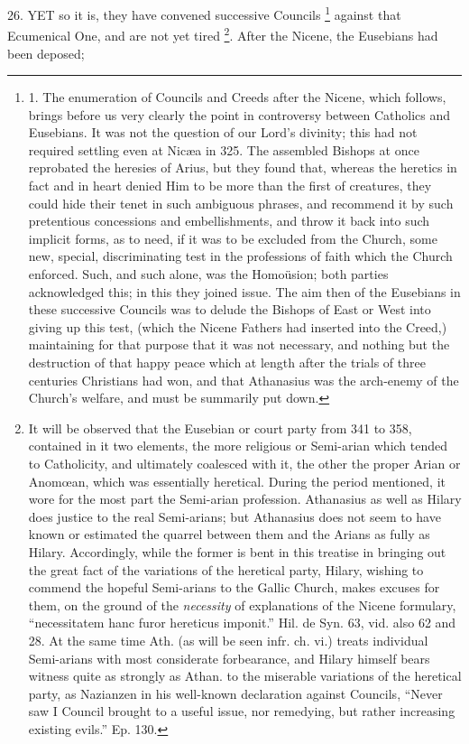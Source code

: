 26. YET
so it is, they have convened successive Councils \footnote{

1. The enumeration of Councils
and Creeds after the Nicene, which follows, brings before us very
clearly the point in controversy between Catholics and Eusebians. It
was not the question of our Lord's divinity; this had not required
settling even at Nicæa in 325. The assembled Bishops at once
reprobated the heresies of Arius, but they found that, whereas the
heretics in fact and in heart denied Him to be more than the first of
creatures, they could hide their tenet in such ambiguous phrases, and
recommend it by such pretentious concessions and embellishments, and
throw it back into such implicit forms, as to need, if it was to be
excluded from the Church, some new, special, discriminating test in
the professions of faith which the Church enforced. Such, and such
alone, was the Homoüsion; both parties acknowledged this; in this
they joined issue. The aim then of the Eusebians in these successive
Councils was to delude the Bishops of East or West into giving up this
test, (which the Nicene Fathers had inserted into the Creed,)
maintaining for that purpose that it was not necessary, and nothing
but the destruction of that happy peace which at length after the
trials of three centuries Christians had won, and that Athanasius was
the arch-enemy of the Church's welfare, and must be summarily put
down.} against that Ecumenical One, and are not yet tired \footnote{It will be observed that the Eusebian or court party from 341 to 358,
contained in it two elements, the more religious or Semi-arian which
tended to Catholicity, and ultimately coalesced with it, the other the
proper Arian or Anomœan, which was essentially heretical. During the
period mentioned, it wore for the most part the Semi-arian profession.
Athanasius as well as Hilary does justice to the real Semi-arians; but
Athanasius does not seem to have known or estimated the quarrel
between them and the Arians as fully as Hilary. Accordingly, while the
former is bent in this treatise in bringing out the great fact of the
variations of the heretical party, Hilary, wishing to commend the
hopeful Semi-arians to the Gallic Church, makes excuses for them, on
the ground of the \emph{necessity} of explanations of the Nicene
formulary, ``necessitatem hanc furor hereticus imponit.'' Hil. de Syn.
63, vid. also 62 and 28. At the same time Ath. (as will be seen infr.
ch. vi.) treats individual Semi-arians with most considerate
forbearance, and Hilary himself bears witness quite as strongly as
Athan. to the miserable variations of the heretical party, as
Nazianzen in his well-known declaration against Councils, ``Never saw I
Council brought to a useful issue, nor remedying, but rather
increasing existing evils.'' Ep. 130.}. After the Nicene, the Eusebians had been deposed;
